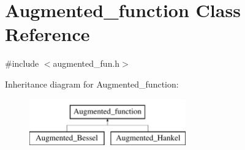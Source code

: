 \hypertarget{classAugmented__function}{}\section{Augmented\+\_\+function Class Reference}
\label{classAugmented__function}


{\ttfamily \#include $<$augmented\+\_\+fun.\+h$>$}

Inheritance diagram for Augmented\+\_\+function\+:\begin{figure}[H]
\begin{center}
\leavevmode
\includegraphics[height=2.000000cm]{classAugmented__function}
\end{center}
\end{figure}
